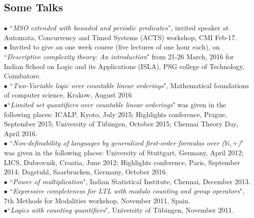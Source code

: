 \documentclass[margin]{res}
\begin{document}
\begin{resume}
\section{Some Talks}
{$\bullet$} ``\emph{MSO extended with bounded and periodic predicates}'', invited speaker at Automata, Concurrency and Timed Systems (ACTS) workshop, CMI Feb-17. \\
{$\bullet$} Invited to give an one week course (five lectures of one hour each), on ``\emph{Descriptive complexity theory: An introduction}" from 21-26 March, 2016 for Indian School on Logic and its Applications (ISLA),  PSG college of Technology, Coimbatore. \\
{$\bullet$} ``\emph{Two-Variable logic over countable linear orderings}", Mathematical foundations of computer science, Krakow, August 2016 \\
{$\bullet$}``\emph{Limited set quantifiers over countable linear orderings}" was given in the following places: ICALP, Kyoto, July 2015; Highlights conference, Prague, September 2015; University of T\"ubingen, October 2015; Chennai Theory Day, April 2016. \\
{$\bullet$} ``\emph{Non-definability of languages by generalized first-order formulas over ($\mathbb{N},+$)}" was given in the following places: University of Stuttgart, Germany, April 2012; LICS, Dubrovnik, Croatia, June 2012; Highlights conference, Paris, September 2014; Dagstuhl, Saarbrucken, Germany, October 2016. \\
{$\bullet$} ``\emph{Power of multiplication}", Indian Statistical Institute, Chennai, December 2013. \\
{$\bullet$} ``\emph{Expressive completeness for LTL with modulo counting and group operators}", 7th Methods for Modalities workshop, November 2011, Spain.  \\
{$\bullet$}``\emph{Logics with counting quantifiers}",  University of T\"ubingen, November 2011.  \\



\end{resume}
\end{document}
